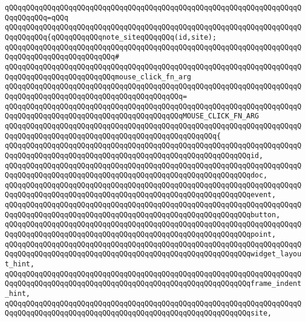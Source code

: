 \verb|qQQqqQQqqQQqqQQqqQQqqQQqqQQqqQQqqQQqqQQqqQQqqQQqqQQqqQQqqQQqqQQqqQQqqQQqqQQqqQQq=qQQq|\newline
\verb|qQQqqQQqqQQqqQQqqQQqqQQqqQQqqQQqqQQqqQQqqQQqqQQqqQQqqQQqqQQqqQQqqQQqqQQqqQQqqQQq{qQQqqQQqqQQqnote_siteqQQqqQQq(id,site);|\newline
\verb|qQQqqQQqqQQqqQQqqQQqqQQqqQQqqQQqqQQqqQQqqQQqqQQqqQQqqQQqqQQqqQQqqQQqqQQqqQQqqQQqqQQqqQQqqQQqqQQq#|\newline
\verb|qQQqqQQqqQQqqQQqqQQqqQQqqQQqqQQqqQQqqQQqqQQqqQQqqQQqqQQqqQQqqQQqqQQqqQQqqQQqqQQqqQQqqQQqqQQqqQQqmouse_click_fn_arg|\newline
\verb|qQQqqQQqqQQqqQQqqQQqqQQqqQQqqQQqqQQqqQQqqQQqqQQqqQQqqQQqqQQqqQQqqQQqqQQqqQQqqQQqqQQqqQQqqQQqqQQqqQQqqQQqqQQqqQQq=|\newline
\verb|qQQqqQQqqQQqqQQqqQQqqQQqqQQqqQQqqQQqqQQqqQQqqQQqqQQqqQQqqQQqqQQqqQQqqQQqqQQqqQQqqQQqqQQqqQQqqQQqqQQqqQQqqQQqqQQqMOUSE_CLICK_FN_ARG|\newline
\verb|qQQqqQQqqQQqqQQqqQQqqQQqqQQqqQQqqQQqqQQqqQQqqQQqqQQqqQQqqQQqqQQqqQQqqQQqqQQqqQQqqQQqqQQqqQQqqQQqqQQqqQQqqQQqqQQqqQQqqQQq{|\newline
\verb|qQQqqQQqqQQqqQQqqQQqqQQqqQQqqQQqqQQqqQQqqQQqqQQqqQQqqQQqqQQqqQQqqQQqqQQqqQQqqQQqqQQqqQQqqQQqqQQqqQQqqQQqqQQqqQQqqQQqqQQqqQQqqQQqid,|\newline
\verb|qQQqqQQqqQQqqQQqqQQqqQQqqQQqqQQqqQQqqQQqqQQqqQQqqQQqqQQqqQQqqQQqqQQqqQQqqQQqqQQqqQQqqQQqqQQqqQQqqQQqqQQqqQQqqQQqqQQqqQQqqQQqqQQqdoc,|\newline
\verb|qQQqqQQqqQQqqQQqqQQqqQQqqQQqqQQqqQQqqQQqqQQqqQQqqQQqqQQqqQQqqQQqqQQqqQQqqQQqqQQqqQQqqQQqqQQqqQQqqQQqqQQqqQQqqQQqqQQqqQQqqQQqqQQqevent,|\newline
\verb|qQQqqQQqqQQqqQQqqQQqqQQqqQQqqQQqqQQqqQQqqQQqqQQqqQQqqQQqqQQqqQQqqQQqqQQqqQQqqQQqqQQqqQQqqQQqqQQqqQQqqQQqqQQqqQQqqQQqqQQqqQQqqQQqbutton,|\newline
\verb|qQQqqQQqqQQqqQQqqQQqqQQqqQQqqQQqqQQqqQQqqQQqqQQqqQQqqQQqqQQqqQQqqQQqqQQqqQQqqQQqqQQqqQQqqQQqqQQqqQQqqQQqqQQqqQQqqQQqqQQqqQQqqQQqpoint,|\newline
\verb|qQQqqQQqqQQqqQQqqQQqqQQqqQQqqQQqqQQqqQQqqQQqqQQqqQQqqQQqqQQqqQQqqQQqqQQqqQQqqQQqqQQqqQQqqQQqqQQqqQQqqQQqqQQqqQQqqQQqqQQqqQQqqQQqwidget_layout_hint,|\newline
\verb|qQQqqQQqqQQqqQQqqQQqqQQqqQQqqQQqqQQqqQQqqQQqqQQqqQQqqQQqqQQqqQQqqQQqqQQqqQQqqQQqqQQqqQQqqQQqqQQqqQQqqQQqqQQqqQQqqQQqqQQqqQQqqQQqframe_indent_hint,|\newline
\verb|qQQqqQQqqQQqqQQqqQQqqQQqqQQqqQQqqQQqqQQqqQQqqQQqqQQqqQQqqQQqqQQqqQQqqQQqqQQqqQQqqQQqqQQqqQQqqQQqqQQqqQQqqQQqqQQqqQQqqQQqqQQqqQQqsite,|\newline
